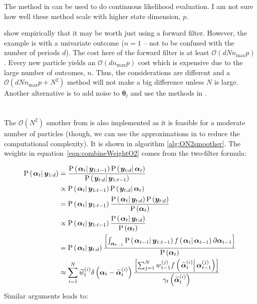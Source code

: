 \documentclass[9pt, notitlepage]{article}
\renewcommand{\vec}[1]{\bm{#1}}
\newcommand{\Lbrac}[1]{\left[ #1\right]}
\newcommand{\Lparen}[1]{\left( #1\right)}
\newcommand{\Cond}[2]{\left. #1 \vphantom{#2} \right\vert  #2}
\newcommand{\Prob}{\text{P}}
\newcommand{\optor}[2]{#1\Lparen{#2}}
\newcommand{\optorC}[3]{\optor{#1}{\Cond{#2}{#3}}}
\newcommand{\prop}[1]{\optor{\Prob}{#1}}
\newcommand{\propC}[2]{\optorC{\Prob}{#1}{#2}}
\newcommand{\dirac}[1]{\optor{\delta}{#1}}
\newcommand{\partic}[3]{#1_{#2}^{\Lparen{#3}}}
\newcommand{\particB}[3]{\widetilde{#1}_{#2}^{\Lparen{#3}}}
\newcommand{\bigO}[1]{\mathcal{O}\Lparen{#1}}
\newcommand{\dimState}{p}
\newcommand{\nPart}{N}
\newcommand{\nPeriods}{d}
\newcommand{\nMax}{n_{\text{max}}}
\begin{document}
The method in \citet[see particularly section 6.2 on page 203]{malik11} can be used to do continuous likelihood evaluation. I am not sure how well these method scale with higher state dimension, $\dimState$.

\citet{kantas15} show empirically that it may be worth just using a forward filter. However, the example is with a univariate outcome ($n=1$ -- not to be confused with the number of periods $\nPeriods$). The cost here of the forward filter is at least $\bigO{\nPeriods\nPart\nMax\dimState}$. Every new particle yields an $\bigO{\nPeriods\nMax\dimState}$ cost which is expensive due to the large number of outcomes, $n$. Thus, the considerations are different and a $\bigO{\nPeriods\nPart\nMax\dimState + \nPart^2}$ method will not make a big difference unless $\nPart$ is large. Another alternative is to add noise to $\vec{\theta}_{t}$ and use the methods in \cite{andrieu02}.

\section{\citet{briers10}}
The $\bigO{\nPart^2}$ smother from \citet{briers10} is also implemented as it is feasible for a moderate number of particles (though, we can use the approximations in \cite{kantas15} to reduce the computational complexity). It is shown in algorithm \ref{alg:ON2smoother}. The weights in equation~\eqref{eqn:combineWeightO2} comes from the two-filter formula:

\begin{equation}\begin{split}
\propC{\vec{\alpha}_t}{\vec{y}_{1:\nPeriods}} &=
	\frac{
		\propC{\vec{\alpha}_t}{\vec{y}_{1:{t-1}}}
		\propC{\vec{y}_{t:\nPeriods}}{\vec{\alpha}_t}
	}{ \propC{\vec{y}_{t:\nPeriods}}{\vec{y}_{1:{t-1}}}} \\
%
& \propto
	\propC{\vec{\alpha}_t}{\vec{y}_{1:{t-1}}}\propC{\vec{y}_{t:\nPeriods}}{\vec{\alpha}_t} \\
%
& = \propC{\vec{\alpha}_t}{\vec{y}_{1:{t-1}}}\frac{
		\propC{\vec{\alpha}_t}{\vec{y}_{t:\nPeriods}}\prop{\vec{y}_{t:\nPeriods}}
	}{ \prop{\vec{\alpha}_t} } \\
%
& \propto \propC{\vec{\alpha}_t}{\vec{y}_{1:{t-1}}}
	\frac{\propC{\vec{\alpha}_t}{\vec{y}_{t:\nPeriods}}
	}{ \prop{\vec{\alpha}_t} } \\
%
& =
	\propC{\vec{\alpha}_t}{\vec{y}_{t:\nPeriods}}
	\frac{
		\Lbrac{\int_{\vec{\alpha}_{t - 1}}
		\propC{\vec{\alpha}_{t-1}}{\vec{y}_{1:{t-1}}}
		\optorC{f}{\vec{\alpha}_t}{\vec{\alpha}_{t - 1}}
		\partial\vec{\alpha}_{t - 1}}
	}{ \prop{\vec{\alpha}_t} } \\
%
& \approx \sum_{i=1}^\nPart
	\particB{w}{t}{i}
	\dirac{\vec{\alpha}_t - \particB{\vec{\alpha}}{t}{i}}
	\frac{
		\Lbrac{\sum_{j = 1}^\nPart
		\partic{w}{t -1}{j}
		\optorC{f}{\particB{\vec{\alpha}}{t}{i}}{\partic{\vec{\alpha}}{t - 1}{j}}}
	}{ \optor{\gamma_t}{\particB{\vec{\alpha}}{t}{i}} }
\end{split}\end{equation}%
%
Similar arguments leads to:
\end{document}
